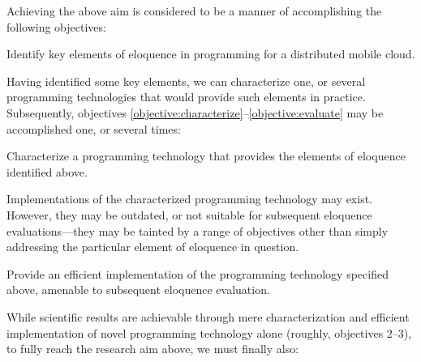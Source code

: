 
Achieving the above aim is considered to be a manner of accomplishing
the following objectives:

\begin{research-objective}\label{objective:identify}

Identify key elements of eloquence in programming for a distributed
mobile cloud.

\end{research-objective}


Having identified some key elements, we can characterize one, or
several programming technologies that would provide such elements in
practice. Subsequently, objectives
\ref{objective:characterize}--\ref{objective:evaluate} may be
accomplished one, or several times:

\begin{research-objective}[Repeated] \label{objective:characterize}

Characterize a programming technology that
provides the elements of eloquence identified above.

\end{research-objective}

Implementations of the characterized programming technology may exist.
However, they may be outdated, or not suitable for subsequent
eloquence evaluations---they may be tainted by a range of objectives
other than simply addressing the particular element of eloquence in
question.

\begin{research-objective}[Repeated] \label{objective:implement}

Provide an efficient implementation of the programming technology
specified above, amenable to subsequent eloquence evaluation.

\end{research-objective}

While scientific results are achievable through mere characterization
and efficient implementation of novel programming technology alone
(roughly, objectives 2--3), to fully reach the research aim above, we
must finally also:

